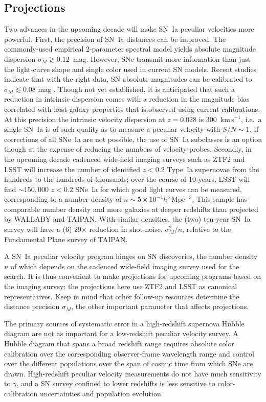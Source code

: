 \documentclass[11pt, oneside]{article}   	%
\begin{document}
\subsection{Projections}
Two advances in the upcoming decade will make SN~Ia peculiar velocities more powerful.
First, the precision of SN~Ia distances can be improved.  The commonly-used empirical 2-parameter spectral model yields  absolute magnitude
dispersion $\sigma_M \gtrsim 0.12$~mag.  However, SNe transmit more information than just the light-curve shape and single color used in current SN models.
Recent studies indicate that with the right data, SN absolute
magnitudes can be calibrated to $\sigma_M \lesssim 0.08$ mag \citep[see e.g.][]{2012MNRAS.425.1007B, 2015ApJ...815...58F}. 
Though not yet
established, it is anticipated that such a reduction in intrinsic dispersion comes with a reduction in the magnitude bias correlated with host-galaxy properties
that is observed using current calibrations.  At this precision the intrinsic velocity dispersion  at $z=0.028$ is  $300$~km\,s$^{-1}$, i.e.\ a single SN~Ia  is of such quality as to
measure a peculiar velocity with $S/N \sim 1$.
 If corrections of all SNe~Ia are not possible, the use of SN~Ia subclasses is an option though at the expense of reducing the
numbers of velocity probes.
Secondly,  in the upcoming decade cadenced wide-field imaging surveys such as ZTF2 and LSST
  will increase the number of identified  $z<0.2$ Type~Ia supernovae from the hundreds to the
hundreds of thousands; over the course of 10-years, LSST will find $\sim150,000$ $z<0.2$ SNe~Ia
 for which good light curves can be measured, corresponding to a  number density of $n \sim 5\times 10^{-4}h^3$\,Mpc$^{-3}$.
  This sample has comparable
 number density and more galaxies at deeper redshifts than projected by WALLABY and TAIPAN.  With similar densities,
 the (two) ten-year SN~Ia survey will have
 a (6) 29$\times$ reduction in shot-noise, $\sigma^2_M/n$, relative to the Fundamental Plane survey of TAIPAN.

A SN~Ia peculiar velocity program hinges on  SN discoveries, the number density $n$ of which
depends on the cadenced wide-field imaging survey used for the search.    
It is thus convenient to make projections for upcoming programs
based on the imaging survey; the projections here use ZTF2 and LSST 
as canonical representatives.
Keep in mind that other follow-up resources determine the distance precision $\sigma_M$, the other important parameter
that affects projections.


The primary sources of systematic error in a high-redshift supernova Hubble diagram are not as important for a low-redshift
peculiar velocity survey.  A Hubble diagram that spans a broad redshift range requires absolute color calibration over the corresponding observer-frame
wavelength range and control over the different populations over the span of cosmic time from which SNe are drawn.  High-redshift peculiar
velocity measurements do not have much sensitivity to $\gamma$, and a SN survey confined to lower redshifts is less sensitive to
color-calibration uncertainties and population evolution.
\end{document}
